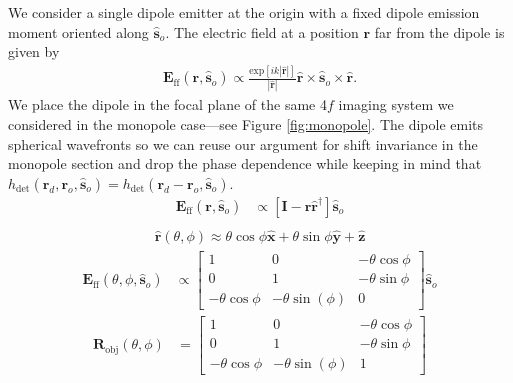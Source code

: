 \documentclass{osa-article}
\providecommand{\mb}[1]{\mathbf{#1}}
\providecommand{\ro}{\mathbf{\mathbf{r}}_o}
\providecommand{\so}{\mathbf{\hat{s}}_o}
\providecommand{\rd}{\mathbf{r}_d}
\providecommand{\mh}[1]{\mathbf{\hat{#1}}}
\begin{document}
We consider a single dipole emitter at the origin with a fixed dipole emission
moment oriented along $\so{}$. The electric field at a position $\mb{r}$ far
from the dipole is given by
\begin{align}
  \mb{E}_{\text{ff}}(\mb{r}, \so{}) \propto \frac{\text{exp}[ik|\mh{r}|]}{|\mh{r}|}\mh{r} \times \so{} \times \mh{r}. \label{eq:ff}
\end{align}
We place the dipole in the focal plane of the same 4$f$ imaging system we
considered in the monopole case---see Figure \ref{fig:monopole}. The dipole
emits spherical wavefronts so we can reuse our argument for shift invariance in
the monopole section and drop the phase dependence while keeping in mind that
$h_{\text{det}}(\rd, \ro, \so) = h_{\text{det}}(\rd - \ro, \so)$.
\begin{align}
  \mb{E}_{\text{ff}}(\mb{r}, \so{}) &\propto [\mb{I} - \mh{r}\mh{r}^{\dagger}]\so \\
\end{align}
\begin{align}
  \mh{r}(\theta,\phi) \approx \theta\cos\phi\mh{x} + \theta\sin\phi\mh{y} + \mh{z}
\end{align}
\begin{align}
  \mb{E}_{\text{ff}}(\theta, \phi, \so{}) &\propto 
  \begin{bmatrix}
    1 & 0 &-\theta \cos\phi\\
    0 & 1 &-\theta \sin\phi\\
    -\theta\cos\phi&-\theta \sin(\phi)&0    
  \end{bmatrix}\so
\end{align}
\begin{align}
  \mb{R}_{\text{obj}}(\theta, \phi) &=
  \begin{bmatrix}
    1 & 0 &-\theta \cos\phi\\
    0 & 1 &-\theta \sin\phi\\
    -\theta\cos\phi&-\theta \sin(\phi)&1    
  \end{bmatrix}
\end{align}
\end{document}
